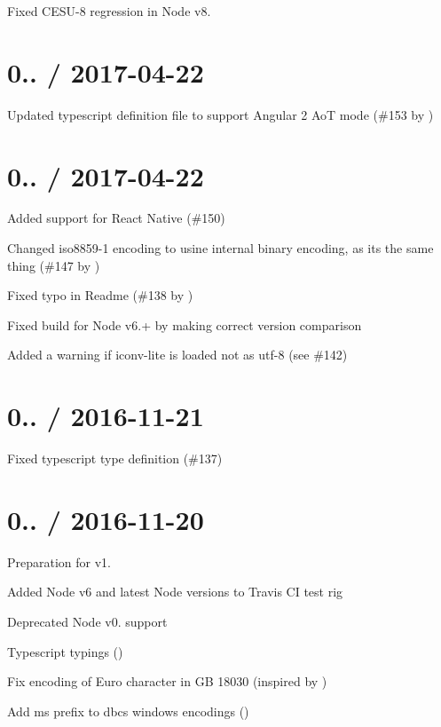 
\begin{DoxyItemize}
\item Fixed C\+E\+S\+U-\/8 regression in Node v8.
\end{DoxyItemize}

\section*{0.. / 2017-\/04-\/22}


\begin{DoxyItemize}
\item Updated typescript definition file to support Angular 2 AoT mode (\#153 by )
\end{DoxyItemize}

\section*{0.. / 2017-\/04-\/22}


\begin{DoxyItemize}
\item Added support for React Native (\#150)
\item Changed iso8859-\/1 encoding to usine internal \textquotesingle{}binary\textquotesingle{} encoding, as it\textquotesingle{}s the same thing (\#147 by )
\item Fixed typo in Readme (\#138 by )
\item Fixed build for Node v6.+ by making correct version comparison
\item Added a warning if iconv-\/lite is loaded not as utf-\/8 (see \#142)
\end{DoxyItemize}

\section*{0.. / 2016-\/11-\/21}


\begin{DoxyItemize}
\item Fixed typescript type definition (\#137)
\end{DoxyItemize}

\section*{0.. / 2016-\/11-\/20}


\begin{DoxyItemize}
\item Preparation for v1.
\item Added Node v6 and latest Node versions to Travis CI test rig
\item Deprecated Node v0. support
\item Typescript typings ()
\item Fix encoding of Euro character in GB 18030 (inspired by )
\item Add ms prefix to dbcs windows encodings ()
\end{DoxyItemize}

